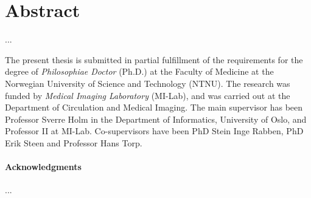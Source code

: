 \documentclass[10pt,b5paper,twoside]{book}
\begin{document}
\chapter*{Abstract}
\thispagestyle{empty}%
...




%
\thispagestyle{empty}%
The present thesis is submitted in partial fulfillment of the requirements for the degree of \textit{Philosophiae Doctor} (Ph.D.) at the Faculty of Medicine at the Norwegian University of Science and Technology (NTNU). The research was funded by \textit{Medical Imaging Laboratory} (MI-Lab), and was carried out at the Department of Circulation and Medical Imaging. The main supervisor has been Professor Sverre Holm  in the Department of Informatics, University of Oslo, and Professor II at MI-Lab. Co-supervisors have been PhD Stein Inge Rabben, PhD Erik Steen and Professor Hans Torp.


\subsubsection{Acknowledgments}
...

\end{document}

